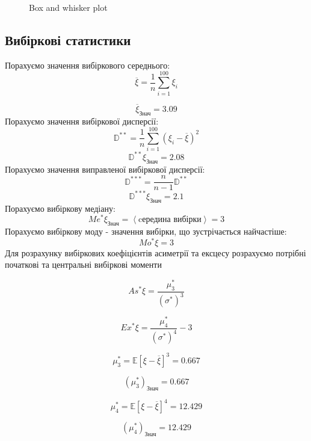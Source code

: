 \documentclass{article}
\begin{document}
\begin{figure}[H]
    \centering
    \caption{Box and whisker plot}
    
\end{figure}
\newpage
\subsection{Вибіркові статистики}
Порахуємо значення вибіркового середнього:
$$\overline{\xi}=\frac{1}{n}\sum_{i=1}^{100} \xi_i$$

$$\overline{\xi}_{\textrm{Знач}}  = 3.09$$
Порахуємо значення вибіркової дисперсії:
$$\mathbb{D}^{**}=\frac{1}{n} \sum_{i=1}^{100} (\xi_i - \overline{\xi})^2$$
$$\mathbb{D}^{**}\xi_{\textrm{Знач}} = 2.08$$
Порахуємо значення виправленої вибіркової дисперсії:
$$\mathbb{D}^{***}=\frac{n}{n-1}\mathbb{D}^{**}$$
$$\mathbb{D}^{***}\xi_{\textrm{Знач}} = 2.1$$
Порахуємо вибіркову медіану:
$$Me^*\xi_{\textrm{Знач}}= \left<\text{cередина вибірки}\right> = 3$$
Порахуємо вибіркову моду - значення вибірки, що зустрічається найчастіше: 
$$Mo^*\xi = 3$$
Для розрахунку вибіркових коефіцієнтів асиметрії та ексцесу розрахуємо потрібні початкові та
центральні вибіркові моменти

$$As^* \xi = \frac{\mu_3^*}{({\sigma^*})^3}$$

$$Ex^* \xi = \frac{\mu_4^*}{({\sigma^*})^4} - 3$$

$$\mu_3^* = \mathbb{E}\left[ \xi - \overline{\xi}\right]^3 = 0.667$$

$$(\mu_3^*)_{\textrm{Знач}} =  0.667$$

$$\mu_4^* = \mathbb{E}\left[ \xi - \overline{\xi}\right]^4 = 12.429$$

$$(\mu_4^*)_{\textrm{Знач}} = 12.429$$
\end{document}
